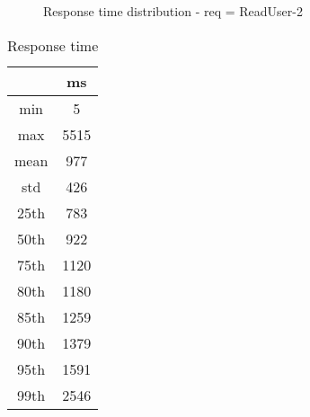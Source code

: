 \begin{minipage}{0.75\linewidth}
\begin{figure}[h]
\begin{adjustbox}{max width=1.0\linewidth, keepaspectratio}
  \end{adjustbox}
  \caption{Response time distribution - req = ReadUser-2}
\end{figure}
\end{minipage}\hfill\begin{minipage}{0.18\linewidth}
\begin{table}[h]
\begin{tabular}{|cc|}
\hline
\textbf{} & \textbf{ms}\\ \hline
 \Xhline{0.005\arrayrulewidth}
min & 5\\
 \Xhline{0.005\arrayrulewidth}
max & 5515\\
 \Xhline{0.005\arrayrulewidth}
mean & 977\\
 \Xhline{0.005\arrayrulewidth}
std & 426\\
\hline
\hline
 \Xhline{0.005\arrayrulewidth}
25th & 783\\
 \Xhline{0.005\arrayrulewidth}
50th & 922\\
 \Xhline{0.005\arrayrulewidth}
75th & 1120\\
 \Xhline{0.005\arrayrulewidth}
80th & 1180\\
 \Xhline{0.005\arrayrulewidth}
85th & 1259\\
 \Xhline{0.005\arrayrulewidth}
90th & 1379\\
 \Xhline{0.005\arrayrulewidth}
95th & 1591\\
 \Xhline{0.005\arrayrulewidth}
99th & 2546\\
\hline
\end{tabular}
\caption{Response time}
\end{table}
\end{minipage}\hfill